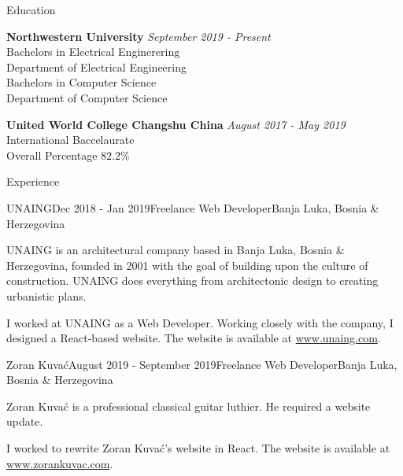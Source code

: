 \documentclass{resume}
\begin{document}
\begin{rSection}{Education}

{\bf Northwestern University} \hfill {\em September 2019 - Present} \\ 
Bachelors in Electrical Enginerering \\
Department of Electrical Engineering \\
Bachelors in Computer Science \\
Department of Computer Science

{\bf United World College Changshu China} \hfill {\em August 2017 - May 2019} \\
International Baccelaurate \\
Overall Percentage $82.2\%$

\end{rSection}

\begin{rSection}{Experience}

\begin{rSubsection}{UNAING}{Dec 2018 - Jan 2019}{Freelance Web Developer}{Banja Luka, Bosnia \& Herzegovina}
\item UNAING is an architectural company based in Banja Luka, Bosnia \& Herzegovina, founded in 2001 with the goal of building upon the culture of construction. UNAING does everything from architectonic design to creating urbanistic plans.
\item I worked at UNAING as a Web Developer. Working closely with the company, I designed a React-based website. The website is available at \url{www.unaing.com}.
\end{rSubsection}

\begin{rSubsection}{Zoran Kuva\'{c}}{August 2019 - September 2019}{Freelance Web Developer}{Banja Luka, Bosnia \& Herzegovina}
\item Zoran Kuva\'{c} is a professional classical guitar luthier. He required a website update.
\item I worked to rewrite Zoran Kuva\'{c}'s website in React. The website is available at \url{www.zorankuvac.com}.
\end{rSubsection}

\end{rSection}
\end{document}
